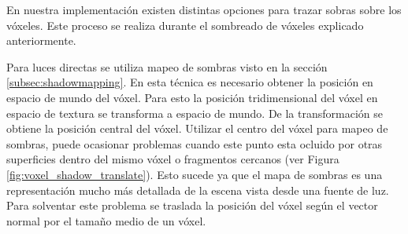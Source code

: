 En nuestra implementación existen distintas opciones para trazar sobras sobre los vóxeles. Este proceso se realiza durante el sombreado de vóxeles explicado anteriormente. 

Para luces directas se utiliza mapeo de sombras visto en la sección \ref{subsec:shadowmapping}. En esta técnica es necesario obtener la posición en espacio de mundo del vóxel. Para esto la posición tridimensional del vóxel en espacio de textura se transforma a espacio de mundo. De la transformación se obtiene la posición central del vóxel. Utilizar el centro del vóxel para mapeo de sombras, puede ocasionar problemas cuando este punto esta ocluido por otras superficies dentro del mismo vóxel o fragmentos cercanos (ver Figura \ref{fig:voxel_shadow_translate}). Esto sucede ya que el mapa de sombras es una representación mucho más detallada de la escena vista desde una fuente de luz. Para solventar este problema se traslada la posición del vóxel según el vector normal por el tamaño medio de un vóxel.

